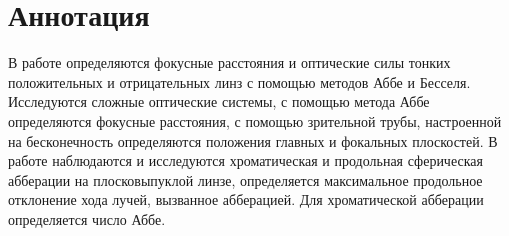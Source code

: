 \section*{Аннотация}

В работе определяются фокусные расстояния и оптические силы тонких положительных и отрицательных линз с помощью методов Аббе и Бесселя. Исследуются сложные оптические системы, с помощью метода Аббе определяются фокусные расстояния, с помощью зрительной трубы, настроенной на бесконечность определяются положения главных и фокальных плоскостей. В работе наблюдаются и исследуются хроматическая и продольная сферическая абберации на плосковыпуклой линзе, определяется максимальное продольное отклонение хода лучей, вызванное абберацией. Для хроматической абберации определяется число Аббе.